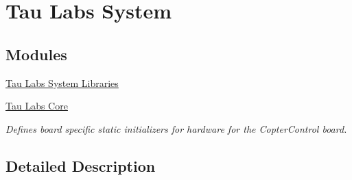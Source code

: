 \hypertarget{group___tau_labs_system}{\section{Tau Labs System}
\label{group___tau_labs_system}
}
\subsection*{Modules}
\begin{DoxyCompactItemize}
\item 
\hyperlink{group___tau_labs_libraries}{Tau Labs System Libraries}
\item 
\hyperlink{group___tau_labs_core}{Tau Labs Core}
\begin{DoxyCompactList}\small\item\em Defines board specific static initializers for hardware for the Copter\-Control board. \end{DoxyCompactList}\end{DoxyCompactItemize}


\subsection{Detailed Description}
